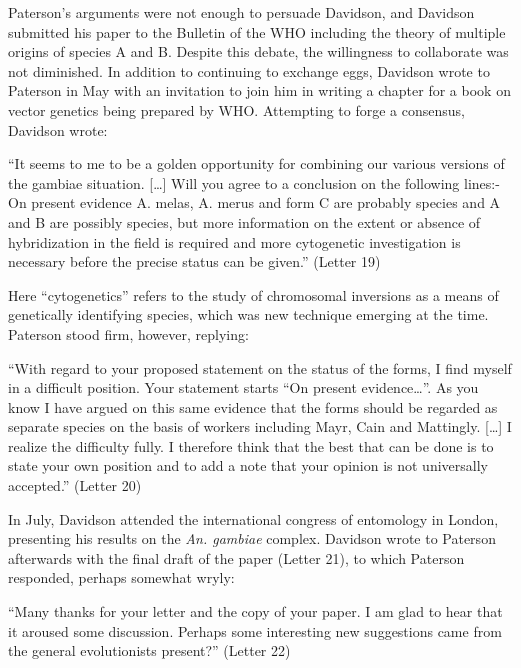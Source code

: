 \begin{refsection}
Paterson's arguments were not enough to persuade Davidson, and Davidson submitted his paper to the Bulletin of the WHO including the theory of multiple origins of species A and B.
%
Despite this debate, the willingness to collaborate was not diminished.
%
In addition to continuing to exchange eggs, Davidson wrote to Paterson in May with an invitation to join him in writing a chapter for a book on vector genetics being prepared by WHO.
%
Attempting to forge a consensus, Davidson wrote:


\begin{displayquote}
``It seems to me to be a golden opportunity for combining our various versions of the gambiae situation. [\ldots] Will you agree to a conclusion on the following lines:- On present evidence A. melas, A. merus and form C are probably species and A and B are possibly species, but more information on the extent or absence of hybridization in the field is required and more cytogenetic investigation is necessary before the precise status can be given.'' (Letter 19)
\end{displayquote}


Here ``cytogenetics'' refers to the study of chromosomal inversions as a means of genetically identifying species, which was new technique emerging at the time.
%
Paterson stood firm, however, replying:


\begin{displayquote}
``With regard to your proposed statement on the status of the forms, I find myself in a difficult position. Your statement starts ``On present evidence\ldots''. As you know I have argued on this same evidence that the forms should be regarded as separate species on the basis of workers including Mayr, Cain and Mattingly. [\ldots] I realize the difficulty fully. I therefore think that the best that can be done is to state your own position and to add a note that your opinion is not universally accepted.'' (Letter 20)
\end{displayquote}


In July, Davidson attended the international congress of entomology in London, presenting his results on the \textit{An. gambiae} complex.
%
Davidson wrote to Paterson afterwards with the final draft of the paper (Letter 21), to which Paterson responded, perhaps somewhat wryly:


\begin{displayquote}
``Many thanks for your letter and the copy of your paper. I am glad to hear that it aroused some discussion. Perhaps some interesting new suggestions came from the general evolutionists present?'' (Letter 22)
\end{displayquote}



\end{refsection}
